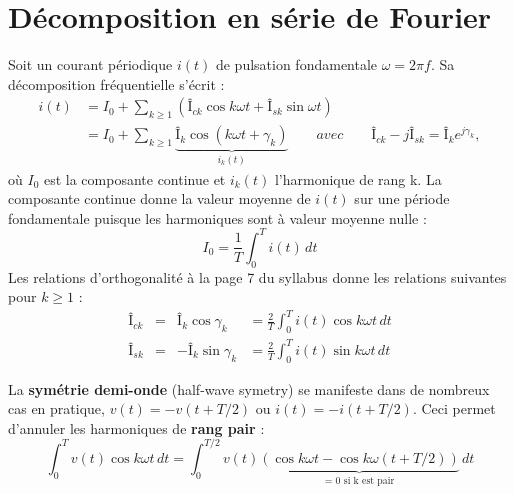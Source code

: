 \section{Décomposition en série de Fourier}
	Soit un courant périodique $i(t)$ de pulsation fondamentale $\omega = 2\pi f$. Sa décomposition fréquentielle s'écrit : 
	\begin{equation}
	\begin{aligned}
		i(t) &= I_0 + \sum _{k\geq 1} \left(Î_{ck} \cos k\omega t + Î_{sk} \sin \omega t\right)\\
			&= I_0 + \sum _{k\geq 1} \underbrace{Î_k \cos (k\omega t +\gamma _k)}_{i_k(t)} \qquad avec \qquad Î_{ck} - jÎ_{sk} = Î_k e^{j\gamma _k},
	\end{aligned}
	\end{equation}
	où $I_0$ est la composante continue et $i_k(t)$ l'harmonique de rang k. La composante continue donne la valeur moyenne de $i(t)$ sur une période fondamentale puisque les harmoniques sont à valeur moyenne nulle : 
	\begin{equation}
		I_0 = \frac{1}{T}\int _0 ^T i(t)\, dt
	\end{equation}
	Les relations d'orthogonalité à la page 7 du syllabus donne les relations suivantes pour $k\geq 1$ : 
	\begin{equation}
	\begin{aligned}
		Î_{ck} &= &Î_k \cos \gamma _k &= \frac{2}{T} \int _0 ^T i(t) \cos k\omega t\, dt\\
		Î_{sk} &= &-Î_k \sin \gamma _k &= \frac{2}{T} \int _0 ^T i(t) \sin k\omega t\, dt
	\end{aligned}
	\end{equation}
	
	La \textbf{symétrie demi-onde} (half-wave symetry) se manifeste dans de nombreux cas en pratique, $v(t) = -v(t+T/2)$ ou $i(t) = -i(t+T/2)$. Ceci permet d'annuler les harmoniques de \textbf{rang pair} : 
	\begin{equation}
		\int _0 ^T v(t)\cos k \omega t \, dt = \int _0 ^{T/2} v(t) \underbrace{\left(\cos k\omega t - \cos k\omega(t+T/2)\right)}_{\mbox{= 0 si k est pair}}\, dt
	\end{equation}
	

